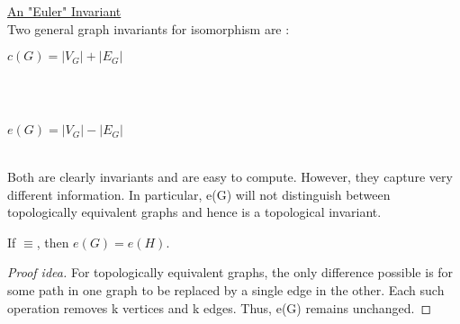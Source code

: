 \documentclass{article}
\def\geom{\text{geom}}
\begin{document}
\newpage
\underline{An "Euler" Invariant} \\
Two general graph invariants for isomorphism are : \\
\centerline {$c(G) = |V_G| + |E_G|$} \\ \\
\centerline {$e(G) = |V_G| - |E_G|$} \\

Both are clearly invariants and are easy to compute. However, they capture very different information. In particular, e(G) will not distinguish between topologically equivalent graphs and hence is a topological invariant. \\

\begin{theorem}
If \geom{G}$ \equiv $\geom{H}, then $e(G) = e(H)$.
\end{theorem}
\begin{proof}[Proof idea]
For topologically equivalent graphs, the only difference possible is for some path in one graph to be replaced by a single edge in the other. Each such operation removes k vertices and k edges. Thus, e(G) remains unchanged.
\end{proof}


\end{document}
